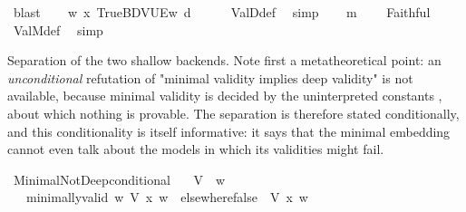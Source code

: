 \begin{isabellebody}
\ blast\isanewline
\ \ \isamarkupfalse%
\ {\isachardoublequoteopen}{\isasymforall}w{\isachardot}{\kern0pt}\ {\isasymlangle}{\isacharparenleft}{\kern0pt}{\isasymlambda}x{\isacharcolon}{\kern0pt}{\isacharcolon}{\kern0pt}{\isasymw}{\isachardot}{\kern0pt}\ True{\isacharparenright}{\kern0pt}{\isacharcomma}{\kern0pt}BDVUEw\ {\isasymTurnstile}\isactrlsup d\ {\isasymphi}{\isachardoublequoteclose}\ \isamarkupfalse%
\ {}\ \isamarkupfalse%
\ ValD{\isacharunderscore}{\kern0pt}def\ \isamarkupfalse%
\ simp\isanewline
\ \ \isamarkupfalse%
\ {\isachardoublequoteopen}{\isasymTurnstile}\isactrlsup m\ {\isasympsi}{\isachardoublequoteclose}\ \isamarkupfalse%
\ {}\ Faithful{}\ \isamarkupfalse%
\ ValM{\isacharunderscore}{\kern0pt}def\ \isamarkupfalse%
\ simp\isanewline
{}\isamarkupfalse%
%
\endisatagproof
{\isafoldproof}%
%
\isadelimproof
%
\endisadelimproof
%
\begin{isamarkuptext}%
Separation of the two shallow backends. Note first a metatheoretical point:
an \emph{unconditional} refutation of "minimal validity implies deep validity" is not
available, because minimal validity is decided by the uninterpreted constants
, about which nothing is provable. The separation is therefore
stated conditionally, and this conditionality is itself informative: it says that
the minimal embedding cannot even talk about the models in which its validities
might fail.%
\end{isamarkuptext}\isamarkuptrue%
\isamarkupfalse%
\ MinimalNotDeep{\isacharunderscore}{\kern0pt}conditional{\isacharcolon}{\kern0pt}\isanewline
\ \ \ V{\isacharcolon}{\kern0pt}{\isacharcolon}{\kern0pt}{\isasymV}\ \ w\isanewline
\ \ \ minimally{\isacharunderscore}{\kern0pt}valid{\isacharcolon}{\kern0pt}\ {\isachardoublequoteopen}{\isasymforall}w{\isachardot}{\kern0pt}\ V\ x\ w{\isachardoublequoteclose}\ \ elsewhere{\isacharunderscore}{\kern0pt}false{\isacharcolon}{\kern0pt}\ {\isachardoublequoteopen}{\isasymnot}\ V\ x\ w\isanewline

\end{isabellebody}

